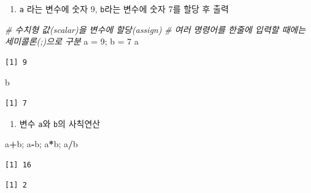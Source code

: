 \documentclass[
  11pt,
]{krantz}
\newenvironment{Shaded}{\begin{snugshade}}{\end{snugshade}}
\newcommand{\CommentTok}[1]{\textcolor[rgb]{0.37,0.37,0.37}{\textit{#1}}}
\newcommand{\DecValTok}[1]{\textcolor[rgb]{0.06,0.06,0.06}{#1}}
\newcommand{\NormalTok}[1]{#1}
\newcommand{\OperatorTok}[1]{\textcolor[rgb]{0.43,0.43,0.43}{\textbf{#1}}}
\newcommand{\StringTok}[1]{\textcolor[rgb]{0.5,0.5,0.5}{#1}}
\providecommand{\tightlist}{%
  \setlength{\itemsep}{0pt}\setlength{\parskip}{0pt}}
\begin{document}
\begin{enumerate}
\def\labelenumi{\arabic{enumi}.}
\setcounter{enumi}{2}
\tightlist
\item
  \texttt{a} 라는 변수에 숫자 9, \texttt{b}라는 변수에 숫자 7를 할당 후 출력
\end{enumerate}

\footnotesize

\begin{Shaded}
\begin{Highlighting}[]
\CommentTok{# 수치형 값(scalar)을 변수에 할당(assign)}
\CommentTok{# 여러 명령어를 한줄에 입력할 때에는 세미콜론(;)으로 구분}
\NormalTok{a =}\StringTok{ }\DecValTok{9}\NormalTok{; b =}\StringTok{ }\DecValTok{7}
\NormalTok{a}
\end{Highlighting}
\end{Shaded}

\begin{verbatim}
[1] 9
\end{verbatim}

\begin{Shaded}
\begin{Highlighting}[]
\NormalTok{b}
\end{Highlighting}
\end{Shaded}

\begin{verbatim}
[1] 7
\end{verbatim}

\normalsize

\begin{enumerate}
\def\labelenumi{\arabic{enumi}.}
\setcounter{enumi}{3}
\tightlist
\item
  변수 \texttt{a}와 \texttt{b}의 사칙연산
\end{enumerate}

\footnotesize

\begin{Shaded}
\begin{Highlighting}[]
\NormalTok{a}\OperatorTok{+}\NormalTok{b; a}\OperatorTok{-}\NormalTok{b; a}\OperatorTok{*}\NormalTok{b; a}\OperatorTok{/}\NormalTok{b}
\end{Highlighting}
\end{Shaded}

\begin{verbatim}
[1] 16
\end{verbatim}

\begin{verbatim}
[1] 2
\end{verbatim}
\end{document}

